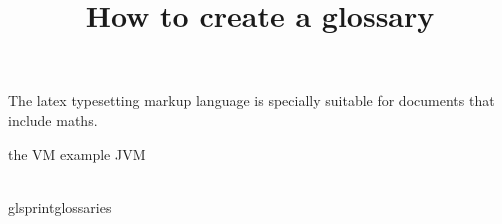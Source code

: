 \documentclass{article}
\title{How to create a glossary}
\author{ }
\date{ }
\begin{document}
\maketitle
 
The \Gls{latex} typesetting markup \gls{language} is specially suitable 
for documents that include \gls{maths}. 

the \Gls{VM} example \gls{JVM}
 
\clearpage
 
\\gls{printglossaries}
 
\end{document}
